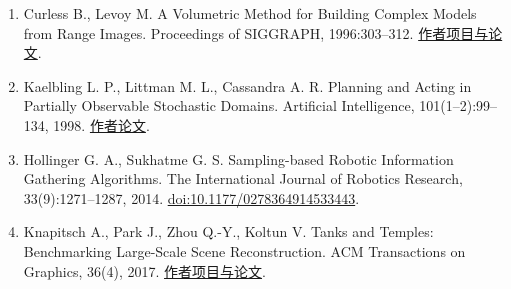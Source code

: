 \documentclass[11pt,a4paper]{article}
\begin{document}
\begin{enumerate}
  Placed J. A., Strader J., Carrillo H., Atanasov N., Indelman V., Carlone L., Castellanos J. A. A Survey on Active Simultaneous Localization and Mapping: State of the Art and New Frontiers. IEEE Transactions on Robotics, 2023. \href{https://arxiv.org/abs/2207.00254}{作者论文与期刊信息}.
\item
  Curless B., Levoy M. A Volumetric Method for Building Complex Models from Range Images. Proceedings of SIGGRAPH, 1996:303--312. \href{https://graphics.stanford.edu/papers/volrange/}{作者项目与论文}.
\item
  Kaelbling L. P., Littman M. L., Cassandra A. R. Planning and Acting in Partially Observable Stochastic Domains. Artificial Intelligence, 101(1--2):99--134, 1998. \href{https://www.cassandra.org/arc/papers/aij98.pdf}{作者论文}.
\item
  Hollinger G. A., Sukhatme G. S. Sampling-based Robotic Information Gathering Algorithms. The International Journal of Robotics Research, 33(9):1271--1287, 2014. \href{https://doi.org/10.1177/0278364914533443}{doi:10.1177/0278364914533443}.
\item
  Knapitsch A., Park J., Zhou Q.-Y., Koltun V. Tanks and Temples: Benchmarking Large-Scale Scene Reconstruction. ACM Transactions on Graphics, 36(4), 2017. \href{https://www.tanksandtemples.org/}{作者项目与论文}.
\end{enumerate}
\end{document}
